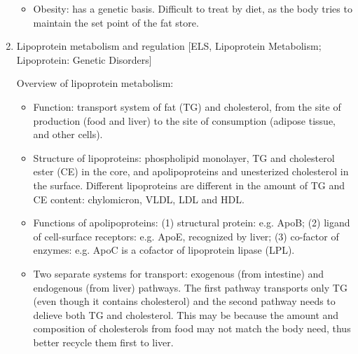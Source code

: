 \documentclass{report}
\begin{document}
\begin{enumerate}
\begin{itemize}
\item Obesity: has a genetic basis. Difficult to treat by diet, as the body tries to maintain the set point of the fat store. 
\end{itemize}

\item{Lipoprotein metabolism and regulation} [ELS, Lipoprotein Metabolism; Lipoprotein: Genetic Disorders]

Overview of lipoprotein metabolism: 
\begin{itemize}
\item Function: transport system of fat (TG) and cholesterol, from the site of production (food and liver) to the site of consumption (adipose tissue, and other cells). 

\item Structure of lipoproteins: phospholipid monolayer, TG and cholesterol ester (CE) in the core, and apolipoproteins and unesterized cholesterol in the surface. Different lipoproteins are different in the amount of TG and CE content: chylomicron, VLDL, LDL and HDL.  

\item Functions of apolipoproteins: (1) structural protein: e.g. ApoB; (2) ligand of cell-surface receptors: e.g. ApoE, recognized by liver; (3) co-factor of enzymes: e.g. ApoC is a cofactor of lipoprotein lipase (LPL). 

\item Two separate systems for transport: exogenous (from intestine) and endogenous (from liver) pathways. The first pathway transports only TG (even though it contains cholesterol) and the second pathway needs to delieve both TG and cholesterol. This may be because the amount and composition of cholesterols from food may not match the body need, thus better recycle them first to liver. 
\end{itemize}


\end{enumerate}
\end{document}
